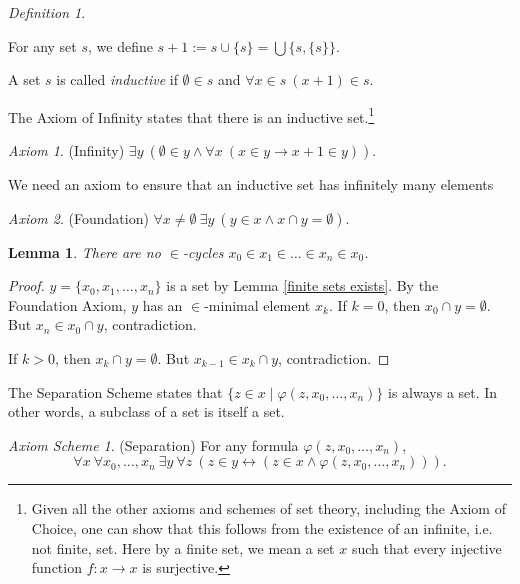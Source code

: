 \documentclass[a4paper, 11pt]{amsart}
\newtheorem{lemma}[lemma]{Lemma}
\theoremstyle{remark}
\newtheorem{definition}[definition]{Definition}
\newtheorem*{axiom}{Axiom}
\newtheorem*{axiomscheme}{Axiom Scheme}
\newenvironment{enumerate-(1)}{\begin{enumerate}[label={\upshape (\arabic*)}, leftmargin=2pc]}{\end{enumerate}}
\begin{document}
\begin{definition} \ 
\begin{enumerate-(1)}
\item 
For any set $s$, we define $s+1:=s\cup \{s\}= \bigcup \{s,\{s\}\}$. 
\item 
A set $s$ is called \emph{inductive} if $\emptyset\in s$ and $\forall x\in s\ (x+1)\in s$. 
\end{enumerate-(1)}
\end{definition} 

The Axiom of Infinity states that there is an inductive set.\footnote{Given all the other axioms and schemes of set theory, including the Axiom of Choice, one can show that this follows from the existence of an infinite, i.e. not finite, set. 
Here by a finite set, we mean a set $x$ such that every injective function $f\colon x\rightarrow x$ is surjective.} 

\begin{axiom}(Infinity) 
$\exists y\ (\emptyset\in y \wedge \forall x\ (x\in y \rightarrow x+1\in y ))$. 
\end{axiom} 

We need an axiom to ensure that an inductive set has infinitely many elements 

\begin{axiom}(Foundation) 
$\forall x\neq\emptyset\ \exists y\ (y\in x \wedge x\cap y =\emptyset)$. 
\end{axiom} 

\begin{lemma} 
\label{no cycles} 
There are no $\in$-cycles $x_0\in x_1\in \dots \in x_n\in x_0$. 
\end{lemma} 
\begin{proof} 
$y=\{x_0, x_1, \dots, x_n\}$ is a set by Lemma \ref{finite sets exists}. 
By the Foundation Axiom, $y$ has an $\in$-minimal element $x_k$. 
If $k=0$, then $x_0\cap y=\emptyset$. 
But $x_n\in x_0\cap y$, contradiction. 

If $k>0$, then $x_k\cap y=\emptyset$. 
But $x_{k-1}\in x_k\cap y$, contradiction. 
\end{proof} 

The Separation Scheme states that $\{z\in x\mid \varphi(z,x_0,\dots,x_n)\}$ is always a set. 
In other words, a subclass of a set is itself a set. 

\begin{axiomscheme}(Separation) 
For any formula $\varphi(z,x_0,\dots,x_n)$, 
$$\forall x\ \forall x_0, \dots, x_n\ \exists y\ \forall z\ (z\in y \leftrightarrow (z\in x \wedge \varphi(z,x_0,\dots,x_n))).$$ 
\end{axiomscheme} 
\end{document}
